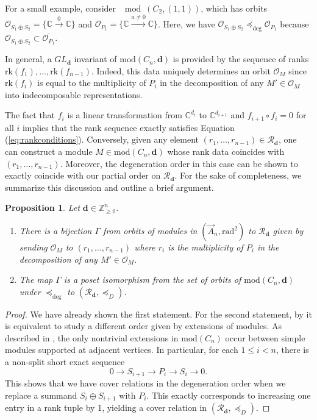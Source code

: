 \documentclass{amsart}
\newtheorem{proposition}[theorem]{Proposition}
\theoremstyle{definition}
\begin{document}
For a small example, consider $\mod(C_2,(1,1))$, which has orbits $\mathcal{O}_{S_1 \oplus S_2} = \{ \mathbb{C} \xrightarrow{0} \mathbb{C}\}$ and $\mathcal{O}_{P_1} =\{ \mathbb{C} \xrightarrow{a \neq 0} \mathbb{C}\}$. Here, we have $\mathcal{O}_{S_1 \oplus S_2} 
\preceq_{\mathrm{deg}} \mathcal{O}_{P_1}$ because $\mathcal{O}_{S_1 \oplus S_2} \subset \overline{\mathcal{O}_{P_1}}$. 

In general, a $GL_{\mathbf{d}}$ invariant of $\mathrm{mod}(C_n,\mathbf{d})$ is provided by the sequence of ranks $\mathrm{rk}(f_1),\ldots, \mathrm{rk}(f_{n-1})$. Indeed, this data uniquely determines an orbit $\mathcal{O}_M$ since $\mathrm{rk}(f_i)$ is equal to the multiplicity of $P_i$ in the decomposition of any $M' \in \mathcal{O}_M$ into indecomposable representations. 

The fact that $f_i$ is a linear transformation from $\mathbb{C}^{d_i}$ to $\mathbb{C}^{d_{i+1}}$ and $f_{i+1} \circ f_i = 0$ for all $i$ implies that the rank sequence exactly satisfies Equation (\ref{eq:rankconditions}). Conversely, given any element $(r_1,\ldots,r_{n-1}) \in \mathcal{R}_{\mathbf{d}}$, one can construct a module $M \in \mathrm{mod}(C_n, \mathbf{d})$ whose rank data coincides with $(r_1,\ldots,r_{n-1})$. 
Moreover, the degeneration order in this case can be shown to exactly coincide with our partial order on $\mathcal{R}_{\mathbf{d}}$. For the sake of completeness, we summarize this discussion and outline a brief argument.


\begin{proposition}\label{prop:DegenOrder}
Let $\mathbf{d} \in \mathbb{Z}_{\ge 0}^n$. 
\begin{enumerate}
    \item There is a bijection $\Gamma$ from orbits of modules in $(\overrightarrow{A}_n,\mathrm{rad}^2)$ to $\mathcal{R}_{\mathbf{d}}$ given by sending $\mathcal{O}_M$ to $(r_1,\ldots,r_{n-1})$ where $r_i$ is the multiplicity of $P_i$ in the decomposition of any $M' \in \mathcal{O}_M$.
    \item The map $\Gamma$ is a poset isomorphism from the set of orbits of $\mathrm{mod}(C_n,\mathbf{d})$ under $\preceq_{\mathrm{deg}}$ to $(\mathcal{R}_{\mathbf{d}}, \preceq_D)$.
\end{enumerate}
\end{proposition}

\begin{proof}
We have already shown the first statement. For the second statement, by \cite[Corollary 4]{Zwara_2000} it is equivalent to study a different order given by extensions of modules. As described in \cite[Lemma 6.2]{Schemes}, the only nontrivial extensions in $\mathrm{mod}(C_n)$ occur between simple modules supported at adjacent vertices. In particular, for each $1 \leq i < n$, there is a non-split short exact sequence 
\[
0 \to S_{i+1} \to P_i \to S_i \to 0.
\]
This shows that we have cover relations in the degeneration order when we replace a summand $S_i \oplus S_{i+1}$ with $P_i$.  This exactly corresponds to increasing one entry in a rank tuple by 1, yielding a cover relation in  $(\mathcal{R}_{\mathbf{d}}, \preceq_D)$.
\end{proof}
\end{document}

